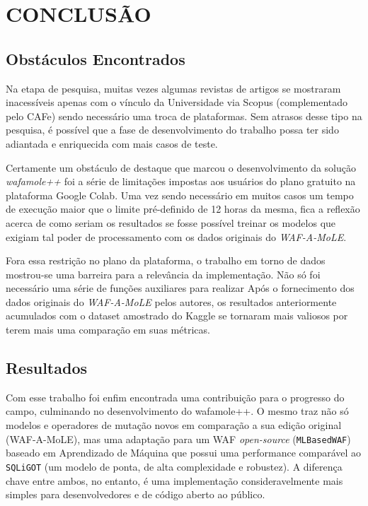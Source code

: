 \chapter{CONCLUSÃO}
\label{chp:capitulo6}

\section{Obstáculos Encontrados}

Na etapa de pesquisa, muitas vezes algumas revistas de artigos se mostraram inacessíveis apenas com o vínculo da Universidade via Scopus (complementado pelo CAFe) sendo necessário uma troca de plataformas. Sem atrasos desse tipo na pesquisa, é possível que a fase de desenvolvimento do trabalho possa ter sido adiantada e enriquecida com mais casos de teste.

Certamente um obstáculo de destaque que marcou o desenvolvimento da solução \textit{wafamole++} foi a série de limitações impostas aos usuários do plano gratuito na plataforma Google Colab. Uma vez sendo necessário em muitos casos um tempo de execução maior que o limite pré-definido de 12 horas da mesma, fica a reflexão acerca de como seriam os resultados se fosse possível treinar os modelos que exigiam tal poder de processamento com os dados originais do \textit{WAF-A-MoLE}.

Fora essa restrição no plano da plataforma, o trabalho em torno de dados mostrou-se uma barreira para a relevância da implementação. Não só foi necessário uma série de funções auxiliares para realizar Após o fornecimento dos dados originais do \textit{WAF-A-MoLE} pelos autores, os resultados anteriormente acumulados com o dataset amostrado do Kaggle se tornaram mais valiosos por terem mais uma comparação em suas métricas.

\section{Resultados}

Com esse trabalho foi enfim encontrada uma contribuição para o progresso do campo, culminando no desenvolvimento do wafamole++. O mesmo traz não só modelos e operadores de mutação novos em comparação a sua edição original (WAF-A-MoLE), mas uma adaptação para um WAF \textit{open-source} (\verb+MLBasedWAF+) baseado em Aprendizado de Máquina que possui uma performance comparável ao \verb+SQLiGOT+ (um modelo de ponta, de alta complexidade e robustez). A diferença chave entre ambos, no entanto, é uma implementação consideravelmente mais simples para desenvolvedores e de código aberto ao público.

